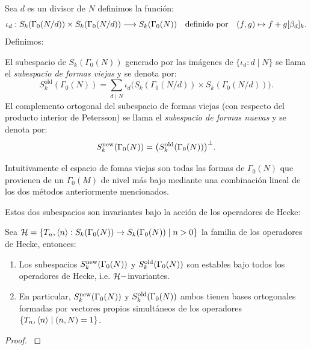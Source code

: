 Sea $d$ es un divisor de $N$ definimos la funci\'on:
\[
  \iota_d:S_k(\Gamma_0(N/d))\times S_k(\Gamma_0(N/d))\longrightarrow S_k(\Gamma_0(N))
  \quad\text{definido por}\quad (f,g)\mapsto f+g[\beta_d]_k.
\]
Definimos:
\begin{defin}
  El subespacio de $S_k(\Gamma_0(N))$ generado por las im\'agenes de $\{\iota_d: d\mid N\}$ se
  llama el \emph{subespacio de formas viejas} y se denota por:
  \[
    S_k^{\mathrm{old}}(\Gamma_0(N))
    =\sum_{d\mid N}\iota_d\big(S_k(\Gamma_0(N/d))\times S_k(\Gamma_0(N/d))\big).
  \]
  El complemento ortogonal del subespacio de formas viejas (con respecto del producto interior de
  Petersson) se llama el \emph{subespacio de formas nuevas} y se denota por:
  \[
    S_k^{\mathrm{new}}(\Gamma_0(N))=\big(S_k^{\mathrm{old}}(\Gamma_0(N))\big)^{\perp}.
  \]
\end{defin}

Intuitivamente el espacio de fomas viejas son todas las formas de $\Gamma_0(N)$ que provienen de un
$\Gamma_0(M)$ de nivel m\'as bajo mediante una combinaci\'on lineal de los dos m\'etodos anteriormente
mencionados.

Estos dos subespacios son invariantes bajo la acción de los operadores de Hecke:

\begin{prop}\label{prop:snew}
  Sea $\mathcal{H}=\{T_n,\langle n \rangle:S_k(\Gamma_0(N))\rightarrow S_k(\Gamma_0(N))\mid n>0\}$ la familia de los operadores de Hecke, entonces:
  \begin{enumerate}[label=\roman*)]
  \item Los subespacios $S_k^{\mathrm{new}}(\Gamma_0(N))$ y $S_k^{\mathrm{old}}(\Gamma_0(N))$ son estables bajo todos los operadores de Hecke, i.e. $\mathcal{H}-$invariantes.
  \item En particular, $S_k^{\mathrm{new}}(\Gamma_0(N))$ y $S_k^{\mathrm{old}}(\Gamma_0(N))$ ambos tienen bases ortogonales formadas por vectores
    propios simult\'aneos de los operadores $\{T_n,\langle n \rangle\mid(n,N)=1\}$.
  \end{enumerate}
\end{prop}
\begin{proof}\cite[\S5.7]{DiamondShurmanAFCIMF}
\end{proof}

